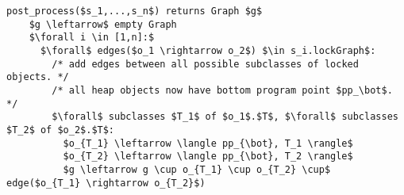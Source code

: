 \begin{lstlisting}[language=CSharp,mathescape,caption=Post processing,label=fig:postProcess]
post_process($s_1,...,s_n$) returns Graph $g$
    $g \leftarrow$ empty Graph
    $\forall i \in [1,n]:$
      $\forall$ edges($o_1 \rightarrow o_2$) $\in s_i.lockGraph$:
        /* add edges between all possible subclasses of locked objects. */
        /* all heap objects now have bottom program point $pp_\bot$. */
        $\forall$ subclasses $T_1$ of $o_1$.$T$, $\forall$ subclasses $T_2$ of $o_2$.$T$:
          $o_{T_1} \leftarrow \langle pp_{\bot}, T_1 \rangle$
          $o_{T_2} \leftarrow \langle pp_{\bot}, T_2 \rangle$
          $g \leftarrow g \cup o_{T_1} \cup o_{T_2} \cup$ edge($o_{T_1} \rightarrow o_{T_2}$)
\end{lstlisting}
